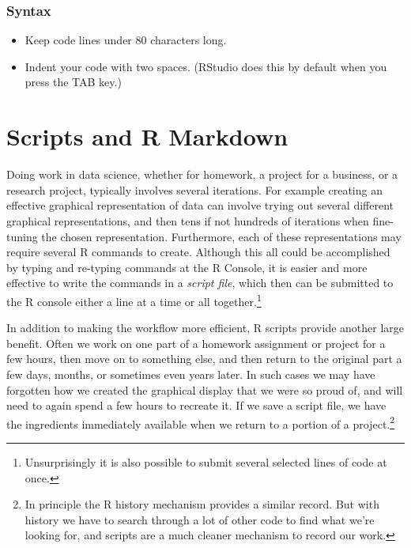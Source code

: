 \documentclass[
]{krantz}
\providecommand{\tightlist}{%
  \setlength{\itemsep}{0pt}\setlength{\parskip}{0pt}}
\begin{document}
\hypertarget{syntax}{%
\subsection{Syntax}\label{syntax}}

\begin{itemize}
\tightlist
\item
  Keep code lines under 80 characters long.
\item
  Indent your code with two spaces. (RStudio does this by default when you press the TAB key.)
\end{itemize}

\hypertarget{scripts-and-r-markdown}{%
\chapter{Scripts and R Markdown}\label{scripts-and-r-markdown}}

Doing work in data science, whether for homework, a project for a business, or a research project, typically involves several iterations. For example creating an effective graphical representation of data can involve trying out several different graphical representations, and then tens if not hundreds of iterations when fine-tuning the chosen representation. Furthermore, each of these representations may require several R commands to create. Although this all could be accomplished by typing and re-typing commands at the R Console, it is easier and more effective to write the commands in a \emph{script file}, which then can be submitted to the R console either a line at a time or all together.\footnote{Unsurprisingly it is also possible to submit several selected lines of code at once.}

In addition to making the workflow more efficient, R scripts provide another large benefit. Often we work on one part of a homework assignment or project for a few hours, then move on to something else, and then return to the original part a few days, months, or sometimes even years later. In such cases we may have forgotten how we created the graphical display that we were so proud of, and will need to again spend a few hours to recreate it. If we save a script file, we have the ingredients immediately available when we return to a portion of a project.\footnote{In principle the R history mechanism provides a similar record. But with history we have to search through a lot of other code to find what we're looking for, and scripts are a much cleaner mechanism to record our work.}
\end{document}
